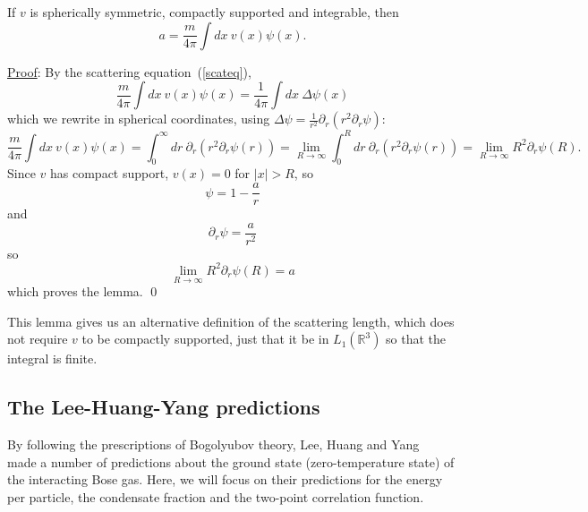 \documentclass{ian}
\begin{document}
\label{lemma:scattering}
  If $v$ is spherically symmetric, compactly supported and integrable, then
  \nopagebreakaftereq
  \begin{equation}
    a=\frac m{4\pi}\int dx\ v(x)\psi(x)
    .
  \end{equation}
\endtheo
\restorepagebreakaftereq
\bigskip

\indent\underline{Proof}:
  By the scattering equation\-~(\ref{scateq}),
  \begin{equation}
    \frac m{4\pi}\int dx\ v(x)\psi(x)
    =
    \frac1{4\pi}\int dx\ \Delta\psi(x)
  \end{equation}
  which we rewrite in spherical coordinates, using $\Delta \psi=\frac1{r^2}\partial_r(r^2\partial_r\psi)$:
  \begin{equation}
    \frac m{4\pi}\int dx\ v(x)\psi(x)
    =
    \int_0^\infty dr\ \partial_r(r^2\partial_r\psi(r))
    =
    \lim_{R\to\infty}\int_0^R dr\ \partial_r(r^2\partial_r\psi(r))
    =
    \lim_{R\to\infty}R^2\partial_r\psi(R)
    .
  \end{equation}
  Since $v$ has compact support, $v(x)=0$ for $|x|>R$, so
  \begin{equation}
    \psi=1-\frac ar
  \end{equation}
  and
  \begin{equation}
    \partial_r\psi=\frac a{r^2}
  \end{equation}
  so
  \begin{equation}
    \lim_{R\to\infty}R^2\partial_r\psi(R)
    =a
  \end{equation}
  which proves the lemma.
\qed
\bigskip

\indent
This lemma gives us an alternative definition of the scattering length, which does not require $v$ to be compactly supported, just that it be in $L_1(\mathbb R^3)$ so that the integral is finite.


\subsection{The Lee-Huang-Yang predictions}\label{sec:lhy}
\indent
By following the prescriptions of Bogolyubov theory, Lee, Huang and Yang\-~\cite{LHY57} made a number of predictions about the ground state (zero-temperature state) of the interacting Bose gas.
Here, we will focus on their predictions for the energy per particle, the condensate fraction and the two-point correlation function.
\bigskip
\end{document}
